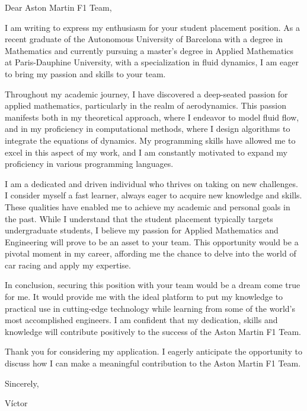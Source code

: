 \documentclass[11pt]{letter}
\begin{document}
\thispagestyle{empty}
Dear Aston Martin F1 Team,

I am writing to express my enthusiasm for your student placement position. As a recent graduate of the Autonomous University of Barcelona with a degree in Mathematics and currently pursuing a master's degree in Applied Mathematics at Paris-Dauphine University, with a specialization in fluid dynamics, I am eager to bring my passion and skills to your team.

Throughout my academic journey, I have discovered a deep-seated passion for applied mathematics, particularly in the realm of aerodynamics. This passion manifests both in my theoretical approach, where I endeavor to model fluid flow, and in my proficiency in computational methods, where I design algorithms to integrate the equations of dynamics. My programming skills have allowed me to excel in this aspect of my work, and I am constantly motivated to expand my proficiency in various programming languages.

I am a dedicated and driven individual who thrives on taking on new challenges. I consider myself a fast learner, always eager to acquire new knowledge and skills. These qualities have enabled me to achieve my academic and personal goals in the past. While I understand that the student placement typically targets undergraduate students, I believe my passion for Applied Mathematics and Engineering will prove to be an asset to your team. This opportunity would be a pivotal moment in my career, affording me the chance to delve into the world of car racing and apply my expertise.

In conclusion, securing this position with your team would be a dream come true for me. It would provide me with the ideal platform to put my knowledge to practical use in cutting-edge technology while learning from some of the world's most accomplished engineers. I am confident that my dedication, skills and knowledge will contribute positively to the success of the Aston Martin F1 Team.

Thank you for considering my application. I eagerly anticipate the opportunity to discuss how I can make a meaningful contribution to the Aston Martin F1 Team.

Sincerely,

Víctor
\end{document}

